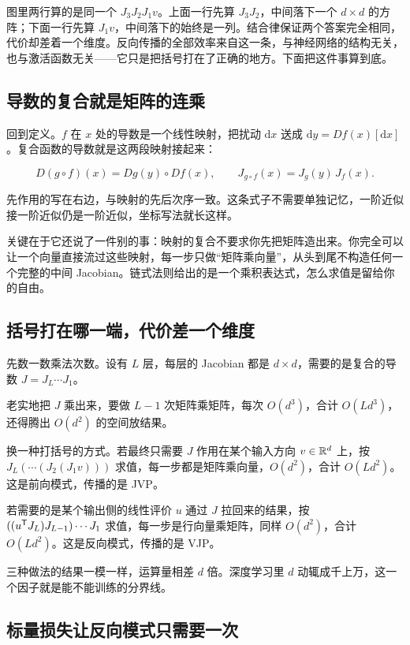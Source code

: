 图里两行算的是同一个 \(J_3J_2J_1v\)。上面一行先算 \(J_3J_2\)，中间落下一个 \(d\times d\) 的方阵；下面一行先算 \(J_1v\)，中间落下的始终是一列。结合律保证两个答案完全相同，代价却差着一个维度。反向传播的全部效率来自这一条，与神经网络的结构无关，也与激活函数无关——它只是把括号打在了正确的地方。下面把这件事算到底。

\subsection{导数的复合就是矩阵的连乘}

回到定义。\(f\) 在 \(x\) 处的导数是一个线性映射，把扰动 \(\mathrm dx\) 送成 \(\mathrm dy=Df(x)[\mathrm dx]\)。复合函数的导数就是这两段映射接起来：

\[
D(g\circ f)(x)=Dg(y)\circ Df(x),
\qquad
J_{g\circ f}(x)=J_g(y)\,J_f(x).
\]

先作用的写在右边，与映射的先后次序一致。这条式子不需要单独记忆，一阶近似接一阶近似仍是一阶近似，坐标写法就长这样。

关键在于它还说了一件别的事：映射的复合不要求你先把矩阵造出来。你完全可以让一个向量直接流过这些映射，每一步只做``矩阵乘向量''，从头到尾不构造任何一个完整的中间 Jacobian。链式法则给出的是一个乘积表达式，怎么求值是留给你的自由。

\subsection{括号打在哪一端，代价差一个维度}

先数一数乘法次数。设有 \(L\) 层，每层的 Jacobian 都是 \(d\times d\)，需要的是复合的导数 \(J=J_L\cdots J_1\)。

老实地把 \(J\) 乘出来，要做 \(L-1\) 次矩阵乘矩阵，每次 \(O(d^3)\)，合计 \(O(Ld^3)\)，还得腾出 \(O(d^2)\) 的空间放结果。

换一种打括号的方式。若最终只需要 \(J\) 作用在某个输入方向 \(v\in\mathbb{R}^d\) 上，按 \(J_L(\cdots(J_2(J_1v)))\) 求值，每一步都是矩阵乘向量，\(O(d^2)\)，合计 \(O(Ld^2)\)。这是前向模式，传播的是 JVP。

若需要的是某个输出侧的线性评价 \(u\) 通过 \(J\) 拉回来的结果，按 \(((u^{\mathsf{T}}J_L)J_{L-1})\cdots J_1\) 求值，每一步是行向量乘矩阵，同样 \(O(d^2)\)，合计 \(O(Ld^2)\)。这是反向模式，传播的是 VJP。

三种做法的结果一模一样，运算量相差 \(d\) 倍。深度学习里 \(d\) 动辄成千上万，这一个因子就是能不能训练的分界线。

\subsection{标量损失让反向模式只需要一次}

